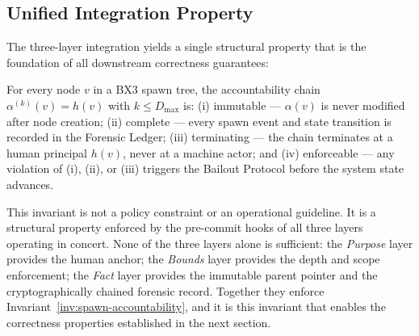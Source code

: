 \subsection{Unified Integration Property}
\label{sec:unified-integration}

The three-layer integration yields a single structural property that is the
foundation of all downstream correctness guarantees:

\begin{invariant}
\label{inv:spawn-accountability}
For every node $v$ in a BX3 spawn tree, the accountability chain
$\alpha^{(k)}(v) = h(v)$ with $k \leq D_{\max}$ is: (i) immutable — $\alpha(v)$
is never modified after node creation; (ii) complete — every spawn event and
state transition is recorded in the Forensic Ledger; (iii) terminating — the
chain terminates at a human principal $h(v)$, never at a machine actor; and
(iv) enforceable — any violation of (i), (ii), or (iii) triggers the Bailout
Protocol before the system state advances.
\end{invariant}

This invariant is not a policy constraint or an operational guideline. It is a
structural property enforced by the pre-commit hooks of all three layers
operating in concert. None of the three layers alone is sufficient: the
\textit{Purpose} layer provides the human anchor; the \textit{Bounds} layer
provides the depth and scope enforcement; the \textit{Fact} layer provides the
immutable parent pointer and the cryptographically chained forensic record.
Together they enforce Invariant~\ref{inv:spawn-accountability}, and it is this
invariant that enables the correctness properties established in the next
section.